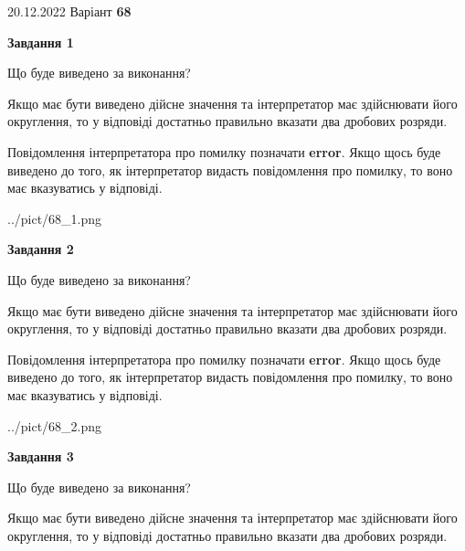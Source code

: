 \documentclass[12pt, ukrainian]{article}
\begin{document}
{20.12.2022 Варіант \No \textbf { 68 }\par}
{
\begin {Large}

{\begin {center}\textbf{Завдання 1}\end {center}}\par
Що буде виведено за виконання? \par

Якщо має бути виведено дійсне значення та інтерпретатор має здійснювати його округлення, 
то у відповіді достатньо правильно вказати два дробових розряди.

Повідомлення інтерпретатора про помилку позначати \textbf{error}.
Якщо щось буде виведено до того, як інтерпретатор видасть повідомлення про помилку, 
то воно має вказуватись у відповіді. \par

\begin{center}
	{../pict/68_1.png}
\end{center}
\newpage

{\begin {center}\textbf{Завдання 2}\end {center}}\par
Що буде виведено за виконання? \par

Якщо має бути виведено дійсне значення та інтерпретатор має здійснювати його округлення, 
то у відповіді достатньо правильно вказати два дробових розряди.

Повідомлення інтерпретатора про помилку позначати \textbf{error}.
Якщо щось буде виведено до того, як інтерпретатор видасть повідомлення про помилку, 
то воно має вказуватись у відповіді. \par

\begin{center}
	{../pict/68_2.png}
\end{center}
\newpage

{\begin {center}\textbf{Завдання 3}\end {center}}\par
Що буде виведено за виконання? \par

Якщо має бути виведено дійсне значення та інтерпретатор має здійснювати його округлення, 
то у відповіді достатньо правильно вказати два дробових розряди.


\end{Large}}
\end{document}
